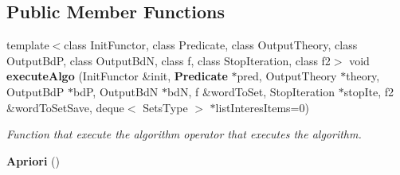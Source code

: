 \subsection*{Public Member Functions}
\begin{CompactItemize}
\item 
template$<$class Init\-Functor, class Predicate, class Output\-Theory, class Output\-Bd\-P, class Output\-Bd\-N, class f, class Stop\-Iteration, class f2$>$ void {\bf execute\-Algo} (Init\-Functor \&init, {\bf Predicate} $\ast$pred, Output\-Theory $\ast$theory, Output\-Bd\-P $\ast$bd\-P, Output\-Bd\-N $\ast$bd\-N, f \&word\-To\-Set, Stop\-Iteration $\ast$stop\-Ite, f2 \&word\-To\-Set\-Save, deque$<$ Sets\-Type $>$ $\ast$list\-Interes\-Items=0)
\begin{CompactList}\small\item\em Function that execute the algorithm operator that executes the algorithm. \item\end{CompactList}\item 
{\bf Apriori} ()\label{class_apriori_8287a89c0b7f56a814f945e75ca29f0d}


\end{CompactItemize}
